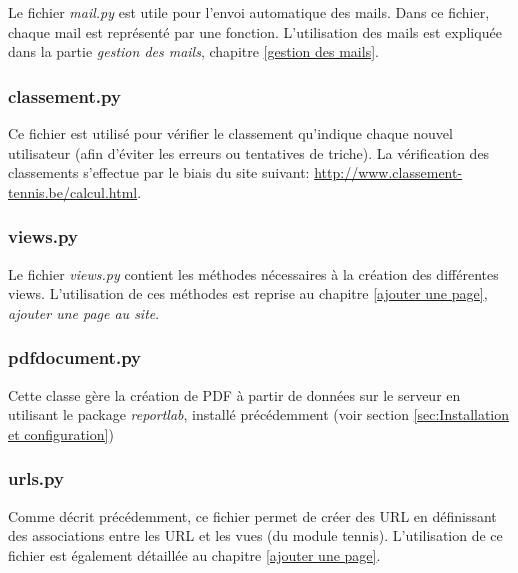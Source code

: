 Le fichier \textit{mail.py} est utile pour l'envoi automatique des mails. Dans ce fichier, chaque mail est représenté par une fonction. L'utilisation des mails est expliquée dans la partie \textit{gestion des mails}, chapitre \ref{gestion des mails}.

\subsubsection{classement.py} 

Ce fichier est utilisé pour vérifier le classement qu'indique chaque nouvel utilisateur (afin d'éviter les erreurs ou tentatives de triche). La vérification des classements s'effectue par le biais du site suivant: \url{http://www.classement-tennis.be/calcul.html}.

\subsubsection{views.py}

Le fichier \textit{views.py} contient les méthodes nécessaires à la création des différentes views. L'utilisation de ces méthodes est reprise au chapitre \ref{ajouter une page}, \textit{ajouter une page au site}.

\subsubsection{pdfdocument.py}

Cette classe gère la création de PDF à partir de données sur le serveur en utilisant le package \textit{reportlab}, installé précédemment (voir section \ref{sec:Installation et configuration})

\subsubsection{urls.py}

Comme décrit précédemment, ce fichier permet de créer des URL en définissant des associations entre les URL et les vues (du module tennis). L'utilisation de ce fichier est également détaillée au chapitre \ref{ajouter une page}.
